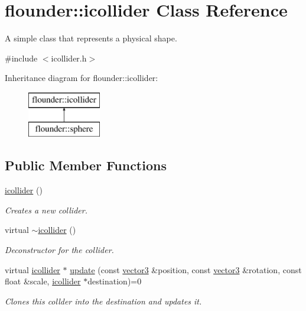 \hypertarget{classflounder_1_1icollider}{}\section{flounder\+:\+:icollider Class Reference}
\label{classflounder_1_1icollider}


A simple class that represents a physical shape.  




{\ttfamily \#include $<$icollider.\+h$>$}

Inheritance diagram for flounder\+:\+:icollider\+:\begin{figure}[H]
\begin{center}
\leavevmode
\includegraphics[height=2.000000cm]{classflounder_1_1icollider}
\end{center}
\end{figure}
\subsection*{Public Member Functions}
\begin{DoxyCompactItemize}
\item 
\hyperlink{classflounder_1_1icollider_a75adcd355b80f9def157cde97c89a1fe}{icollider} ()
\begin{DoxyCompactList}\small\item\em Creates a new collider. \end{DoxyCompactList}\item 
virtual \hyperlink{classflounder_1_1icollider_a8520c4acec0d91cd3d8bf1c381ad2da3}{$\sim$icollider} ()
\begin{DoxyCompactList}\small\item\em Deconstructor for the collider. \end{DoxyCompactList}\item 
virtual \hyperlink{classflounder_1_1icollider}{icollider} $\ast$ \hyperlink{classflounder_1_1icollider_a946ddd743680d0abc7b086d49f882e6f}{update} (const \hyperlink{classflounder_1_1vector3}{vector3} \&position, const \hyperlink{classflounder_1_1vector3}{vector3} \&rotation, const float \&scale, \hyperlink{classflounder_1_1icollider}{icollider} $\ast$destination)=0
\begin{DoxyCompactList}\small\item\em Clones this collder into the destination and updates it. \end{DoxyCompactList}\end{DoxyCompactItemize}


